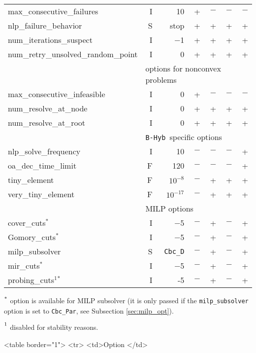 {\begin{latexonly}
\begin{threeparttable}
\begin{tabular}{|l|r|r|r|r|r|r|}
max\_consecutive\_failures & I & 10 & + & $-$ & $-$ & $-$\\
nlp\_failure\_behavior & S & stop   & + & + & + & + \\
num\_iterations\_suspect & I & $-$1 & + & + & + & + \\
num\_retry\_unsolved\_random\_point & I & 0 & + & + & + & + \\
\hline
\multicolumn{1}{|c}{} & \multicolumn{6}{l|}{options for nonconvex problems}\\
\hline
max\_consecutive\_infeasible & I & 0 & + & $-$ & $-$ & $-$\\
num\_resolve\_at\_node & I & 0 & + & +  & + & + \\
num\_resolve\_at\_root & I & 0& + & + & + & +  \\
\hline
\multicolumn{1}{|c}{} & \multicolumn{6}{l|}{{\tt B-Hyb }specific options}\\
\hline
nlp\_solve\_frequency & I & 10 & $-$ & $-$ & $-$ & +\\
oa\_dec\_time\_limit & F& 120 & $-$ & $-$ & $-$ & +\\
tiny\_element & F & $10^{-8}$ & $-$ & + & + & + \\
very\_tiny\_element & F & $10^{-17}$ & $-$ & + & + & + \\
\hline
\multicolumn{1}{|c}{} & \multicolumn{6}{l|}{MILP options}\\
\hline
cover\_cuts$^*$  & I & $-$5 & $-$ & + & $-$ & +\\
Gomory\_cuts$^*$ & I & $-$5 & $-$ &  + & $-$ & + \\
milp\_subsolver &S & {\tt Cbc\_D} & $-$ & + & $-$ & + \\
mir\_cuts$^*$  & I & $-$5 & $-$  & + & $-$ &+\\
probing\_cuts$^1$$^*$  & I & -5 & $-$ & + & $-$ & +\\
\hline
\end{tabular}
\begin{tablenotes}
\item $\strut^*$ option is available
         for MILP subsolver (it is only passed if the {\tt milp\_subsolver} option is set to {\tt Cbc\_Par},
         see Subsection \ref{sec:milp_opt}).
\item $\strut^1$ disabled for stability reasons.
\end{tablenotes}
\end{threeparttable}
\end{latexonly}
}{
\begin{rawhtml}
<table border="1">
  <tr>
    <td>Option </td>

\end{rawhtml}}
